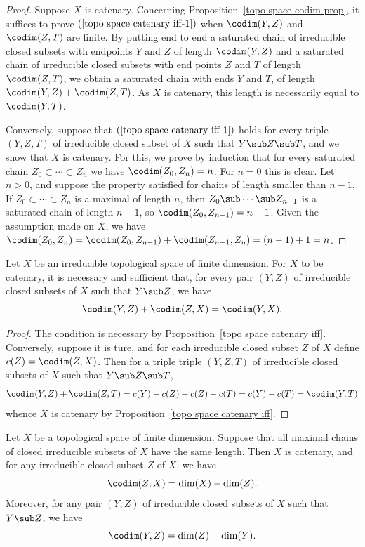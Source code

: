 \begin{proof}
Suppose $X$ is catenary. Concerning Proposition~\ref{topo space codim prop}, it suffices to prove $(\ref{topo space catenary iff-1})$ when $\codim(Y,Z)$ and $\codim(Z,T)$ are finite. By putting end to end a saturated chain of irreducible closed subsets with endpoints $Y$ and $Z$ of length $\codim(Y,Z)$ and a saturated chain of irreducible closed subsets with end points $Z$ and $T$ of length $\codim(Z,T)$, we obtain a saturated chain with ends $Y$ and $T$, of length $\codim(Y,Z)+\codim(Z,T)$. As $X$ is catenary, this length is necessarily equal to $\codim(Y,T)$.\par
Conversely, suppose that $(\ref{topo space catenary iff-1})$ holds for every triple $(Y,Z,T)$ of irreducible closed subset of $X$ such that $Y\sub Z\sub T$, and we show that $X$ is catenary. For this, we prove by induction that for every saturated chain $Z_0\subset\cdots\subset Z_n$ we have $\codim(Z_0,Z_n)=n$. For $n=0$ this is clear. Let $n>0$, and suppose the property satisfied for chains of length smaller than $n-1$. If $Z_0\subset\cdots\subset Z_n$ is a maximal of length $n$, then $Z_0\sub\cdots \sub Z_{n-1}$ is a saturated chain of length $n-1$, so $\codim(Z_0,Z_{n-1})=n-1$. Given the assumption made on $X$, we have $\codim(Z_0,Z_n)=\codim(Z_0,Z_{n-1})+\codim(Z_{n-1},Z_n)=(n-1)+1=n$.
\end{proof}
\begin{corollary}\label{topo space irreducible finite dim catenary iff}
Let $X$ be an irreducible topological space of finite dimension. For $X$ to be catenary, it is necessary and sufficient that, for every pair $(Y,Z)$ of irreducible closed subsets of $X$ such that $Y\sub Z$, we have
\[\codim(Y,Z)+\codim(Z,X)=\codim(Y,X).\]
\end{corollary}
\begin{proof}
The condition is necessary by Proposition~\ref{topo space catenary iff}. Conversely, suppose it is ture, and for each irreducible closed subset $Z$ of $X$ define $c(Z)=\codim(Z,X)$. Then for a triple triple $(Y,Z,T)$ of irreducible closed subsets of $X$ such that $Y\sub Z\sub T$,
\[\codim(Y,Z)+\codim(Z,T)=c(Y)-c(Z)+c(Z)-c(T)=c(Y)-c(T)=\codim(Y,T)\]
whence $X$ is catenary by Proposition~\ref{topo space catenary iff}.
\end{proof}
\begin{proposition}\label{topo space maximal chain same length is catenary}
Let $X$ be a topological space of finite dimension. Suppose that all maximal chains of closed irreducible subsets of $X$ have the same length. Then $X$ is catenary, and for any irreducible closed subset $Z$ of $X$, we have
\[\codim(Z,X)=\dim(X)-\dim(Z).\]
Moreover, for any pair $(Y,Z)$ of irreducible closed subsets of $X$ such that $Y\sub Z$, we have
\[\codim(Y,Z)=\dim(Z)-\dim(Y).\]
\end{proposition}

